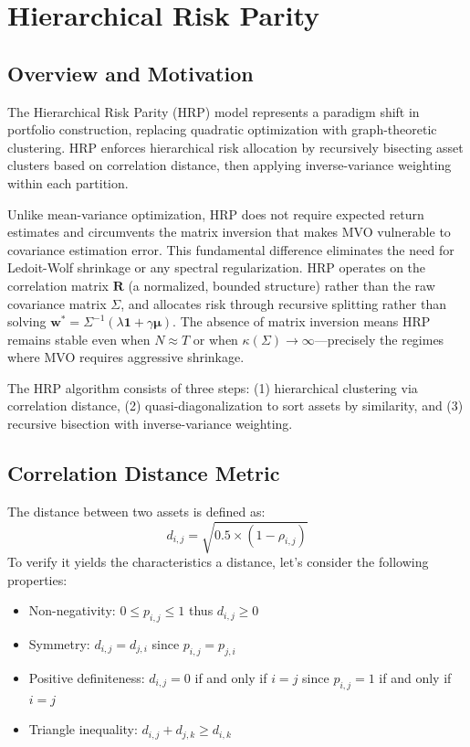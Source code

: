 \documentclass[11pt,a4paper]{article}
\begin{document}
\section{Hierarchical Risk Parity}

\subsection{Overview and Motivation}
The Hierarchical Risk Parity (HRP) model represents a paradigm shift in portfolio construction, replacing quadratic optimization with graph-theoretic clustering. HRP enforces hierarchical risk allocation by recursively bisecting asset clusters based on correlation distance, then applying inverse-variance weighting within each partition.

Unlike mean-variance optimization, HRP does not require expected return estimates and circumvents the matrix inversion that makes MVO vulnerable to covariance estimation error. This fundamental difference eliminates the need for Ledoit-Wolf shrinkage or any spectral regularization. HRP operates on the correlation matrix $\mathbf{R}$ (a normalized, bounded structure) rather than the raw covariance matrix $\Sigma$, and allocates risk through recursive splitting rather than solving $\mathbf{w}^* = \Sigma^{-1}(\lambda \mathbf{1} + \gamma \bm{\mu})$. The absence of matrix inversion means HRP remains stable even when $N \approx T$ or when $\kappa(\Sigma) \to \infty$—precisely the regimes where MVO requires aggressive shrinkage.

The HRP algorithm consists of three steps: (1) hierarchical clustering via correlation distance, (2) quasi-diagonalization to sort assets by similarity, and (3) recursive bisection with inverse-variance weighting.

\subsection{Correlation Distance Metric}
The distance between two assets is defined as:
\begin{equation}
    d_{i,j} = \sqrt{0.5 \times (1 - \rho_{i,j})}
\end{equation}
To verify it yields the characteristics a distance, let's consider the following properties:
\begin{itemize}
    \item Non-negativity: $0 \le p_{i,j} \le 1$ thus $d_{i,j} \ge 0$
    \item Symmetry: $d_{i,j} = d_{j,i}$ since $p_{i,j} = p_{j,i}$
    \item Positive definiteness: $d_{i,j} = 0$ if and only if $i = j$ since $p_{i,j} = 1$ if and only if $i = j$
    \item Triangle inequality: $d_{i,j} + d_{j,k} \geq d_{i,k}$
\end{itemize}
\end{document}
